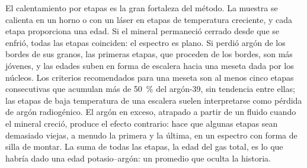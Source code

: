 El calentamiento por etapas es la gran fortaleza del método. La muestra se calienta en un horno
o con un láser en etapas de temperatura creciente, y cada etapa proporciona una edad.
Si el mineral permaneció cerrado desde que se enfrió, todas las etapas coinciden: el espectro es
plano. Si perdió argón de los bordes de sus granos, las primeras etapas, que
proceden de los bordes, son más jóvenes, y las edades suben en forma de escalera hacia una
meseta dada por los núcleos. Los criterios recomendados para una meseta son al
menos cinco etapas consecutivas que acumulan más de \qty{50}{\percent} del
argón-39, sin tendencia entre ellas; las etapas de baja temperatura de una escalera
suelen interpretarse como pérdida de argón radiogénico. El argón en exceso, atrapado a partir de un
fluido cuando el mineral creció, produce el efecto contrario: hace que algunas etapas sean demasiado viejas,
a menudo la primera y la última, en un espectro con forma de silla de montar. La suma de todas las
etapas, la edad del gas total, es lo que habría dado una edad potasio--argón: un
promedio que oculta la historia.

